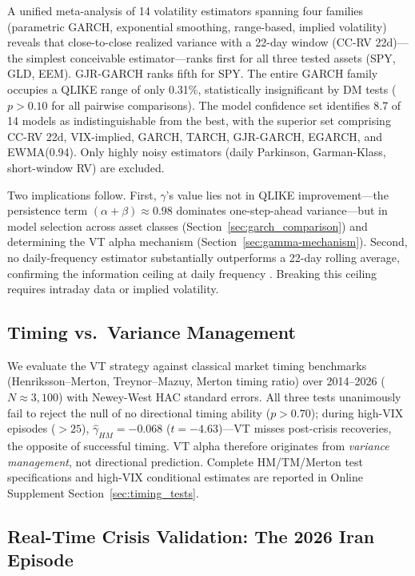 A unified meta-analysis of 14 volatility estimators spanning four families (parametric GARCH, exponential smoothing, range-based, implied volatility) reveals that close-to-close realized variance with a 22-day window (CC-RV 22d)---the simplest conceivable estimator---ranks first for all three tested assets (SPY, GLD, EEM). GJR-GARCH ranks fifth for SPY. The entire GARCH family occupies a QLIKE range of only 0.31\%, statistically insignificant by DM tests ($p > 0.10$ for all pairwise comparisons). The model confidence set \citep{hansen2011} identifies 8.7 of 14 models as indistinguishable from the best, with the superior set comprising CC-RV 22d, VIX-implied, GARCH, TARCH, GJR-GARCH, EGARCH, and EWMA(0.94). Only highly noisy estimators (daily Parkinson, Garman-Klass, short-window RV) are excluded.

Two implications follow. First, $\gamma$'s value lies not in QLIKE improvement---the persistence term $(\alpha + \beta) \approx 0.98$ dominates one-step-ahead variance---but in model selection across asset classes (Section~\ref{sec:garch_comparison}) and determining the VT alpha mechanism (Section~\ref{sec:gamma-mechanism}). Second, no daily-frequency estimator substantially outperforms a 22-day rolling average, confirming the information ceiling at daily frequency \citep{patton2011}. Breaking this ceiling requires intraday data or implied volatility.

\subsection{Timing vs.\ Variance Management}
\label{sec:timing_note_body}

We evaluate the VT strategy against classical market timing benchmarks (Henriksson--Merton, Treynor--Mazuy, Merton timing ratio) over 2014--2026 ($N \approx 3{,}100$) with Newey-West HAC standard errors. All three tests unanimously fail to reject the null of no directional timing ability ($p > 0.70$); during high-VIX episodes ($>25$), $\hat{\gamma}_{HM} = -0.068$ ($t = -4.63$)---VT misses post-crisis recoveries, the opposite of successful timing. VT alpha therefore originates from \textit{variance management}, not directional prediction. Complete HM/TM/Merton test specifications and high-VIX conditional estimates are reported in Online Supplement Section~\ref{sec:timing_tests}.

\subsection{Real-Time Crisis Validation: The 2026 Iran Episode}

